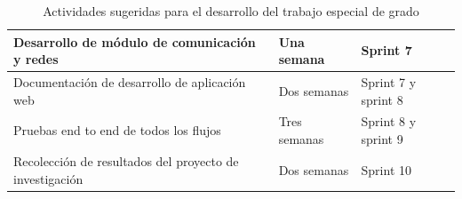 \begin{table}[!htb]
\begin{tabular}{| m{6.5cm}| m{3.5cm}| m{4cm}|}
Desarrollo de módulo de comunicación y redes & Una semana & Sprint 7\\ \hline

Documentación de desarrollo de aplicación web & Dos semanas & Sprint 7 y sprint 8\\ \hline

Pruebas end to end de todos los flujos & Tres semanas & Sprint 8 y sprint 9\\ \hline

Recolección de resultados del proyecto de investigación & Dos semanas & Sprint 10\\ \hline

\end{tabular}
\caption{Actividades sugeridas para el desarrollo del trabajo especial de grado}
\label{tabla:actividades_desarrollo}
\end{table}
 
